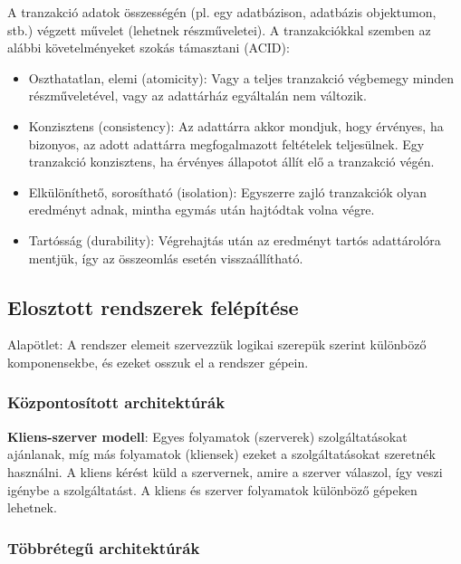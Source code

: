 \documentclass[margin=0px]{article}
\begin{document}
	A tranzakció adatok összességén (pl. egy adatbázison, adatbázis objektumon, stb.) végzett művelet (lehetnek részműveletei).
	A tranzakciókkal szemben az alábbi követelményeket szokás támasztani (ACID):
	
	\begin{itemize}
		\item	Oszthatatlan, elemi (atomicity): Vagy a teljes tranzakció végbemegy minden részműveletével, vagy az
		adattárház egyáltalán nem változik.
		
		\item	Konzisztens (consistency): Az adattárra akkor mondjuk, hogy érvényes, ha bizonyos, az adott adattárra
		megfogalmazott feltételek teljesülnek. Egy tranzakció konzisztens, ha érvényes állapotot állít elő a tranzakció
		végén.
		
		\item	Elkülöníthető, sorosítható (isolation): Egyszerre zajló tranzakciók olyan eredményt adnak, mintha
		egymás után hajtódtak volna végre.
		
		\item	Tartósság (durability): Végrehajtás után az eredményt tartós adattárolóra mentjük, így az összeomlás esetén
		visszaállítható.
	\end{itemize}
	
	
	\subsection{Elosztott rendszerek felépítése}
	Alapötlet: A rendszer elemeit szervezzük logikai szerepük szerint különböző komponensekbe, és ezeket osszuk
	el a rendszer gépein.\\
	
	\subsubsection{Központosított architektúrák}
	
	\noindent \textbf{Kliens-szerver modell}: Egyes folyamatok (szerverek) szolgáltatásokat ajánlanak, míg más folyamatok (kliensek)
	ezeket a szolgáltatásokat szeretnék használni. A kliens kérést küld a szervernek, amire a szerver válaszol, így veszi igénybe
	a szolgáltatást. A kliens és szerver folyamatok különböző gépeken lehetnek.
	
	\subsubsection{Többrétegű architektúrák}
	
\end{document}
